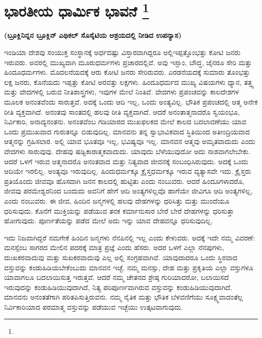 
\chapter[ಭಾರತೀಯ ಧಾರ್ಮಿಕ ಭಾವನೆ ]{ಭಾರತೀಯ ಧಾರ್ಮಿಕ ಭಾವನೆ \protect\footnote{}}

\centerline{\textbf{(ಬ್ರೂಕ್ಲಿನಿನ್ನನ ಬ್ರೂಕ್ಲಿನ್​ ಎಥಿಕಲ್​ ಸೊಸೈಟಿಯ ಆಶ್ರಯದಲ್ಲಿ ನೀಡಿದ ಉಪನ್ಯಾಸ)}}

ಇಂಡಿಯಾ ದೇಶವು ಸಂಯುಕ್ತ ಸಂಸ್ಥಾನಕ್ಕೆ ಅರ್ಧದಷ್ಟು ವಿಸ್ತಾರವಾಗಿದ್ದರೂ ಅಲ್ಲಿ\break ಇಪ್ಪತ್ತೊಂಭತ್ತು ಕೋಟಿ ಜನರು ಇರುವರು. ಅವರಲ್ಲಿ ಮುಖ್ಯವಾಗಿ ಮೂರು\break ಧರ್ಮಗಳು ಪ್ರಚಾರದಲ್ಲಿವೆ. ಅವು ಇಸ್ಲಾಂ, ಬೌದ್ಧ, ಜೈನರೂ ಸೇರಿ ಮತ್ತು ಹಿಂದೂಧರ್ಮಗಳು. ಮೊದಲನೆಯದಕ್ಕೆ ಆರು ಕೋಟಿ ಜನರು ಸೇರಿರುವರು. ಎರಡನೆಯದಕ್ಕೆ ಸುಮಾರು ತೊಂಭತ್ತು ಲಕ್ಷ ಜನರು, ಕೊನೆಯದು ಇಪ್ಪತ್ತು ಕೋಟಿ ಅರವತ್ತು ಲಕ್ಷಗಳು. ಹಿಂದೂಧರ್ಮದ ಮುಖ್ಯ ವಿಷಯಗಳು ಧ್ಯಾನ, ತತ್ತ್ವ ಮತ್ತು ವೇದಗಳಲ್ಲಿ ಬರುವ ನೀತಿಶಾಸ್ತ್ರಗಳು, ಇವುಗಳ ಮೇಲೆ ನಿಂತಿವೆ. ವೇದಗಳು ಪ್ರಪಂಚವನ್ನು ಕಾಲದೇಶಗಳ ಮೂಲಕ ಅನಂತವೆಂದು ಸಾರುತ್ತವೆ. ಅದಕ್ಕೆ ಒಂದು ಆದಿ ಇಲ್ಲ, ಒಂದು ಅಂತ್ಯವಿಲ್ಲ. ಭೌತಿಕ ಪ್ರಪಂಚದಲ್ಲಿ ಆತ್ಮ ಅನೇಕ ರೀತಿ ವ್ಯಕ್ತವಾಗಿದೆ. ಅನಂತವು ಸಾಂತದಲ್ಲಿ ಹಲವು ರೀತಿ ವ್ಯಕ್ತವಾಗಿದೆ. ಆದರೆ ಅನಂತಾತ್ಮನಾದರೊ ಸ್ವಯಂಭೂ, ನಿರ್ವಿಕಾರಿ, ಅನಾದ್ಯನಂತನು. ಅನಂತವೆಂಬ ಗಡಿಯಾರದ ಮುಖಫಲಕದ ಮೇಲೆ ಕಾಲದ ಬದಲಾವಣೆಯು ಯಾವ ಒಂದು ಪ್ರಮುಖವಾದ ಗುರುತನ್ನೂ ಬಿಡುವುದಿಲ್ಲ. ಮಾನವನು ತನ್ನ ಸ್ವಾಭಾವಿಕವಾದ ಸ್ಥಿತಿಯಿಂದ ಅತೀಂದ್ರಿಯವಾದ ಆತ್ಮನನ್ನು ಗ್ರಹಿಸಲಾರ. ಅಲ್ಲಿ ಯಾವ ಭೂತವೂ ಇಲ್ಲ, ಭವಿಷ್ಯವೂ ಇಲ್ಲ. ಮಾನವನ ಆತ್ಮವು ಅಮೃತವಾದುದು ಎಂದು ವೇದಗಳು ಸಾರುವುವು. ದೇಹವು ಷಡ್ವಿಕಾರಾತ್ಮಕವಾದುದು. ಯಾವುದು ಬೆಳೆಯುವುದೋ ಅದು ನಾಶವಾಗಲೇಬೇಕು. ಆದರೆ ಒಳಗೆ ಇರುವ ಆತ್ಮನಾದರೊ ಅನಂತವಾದ ಮತ್ತು ನಿತ್ಯವಾದ ಜೀವನಕ್ಕೆ ಸಂಬಂಧಿಸಿರುವುದು. ಅದಕ್ಕೆ ಒಂದು ಆದಿಯೇ ಇರಲಿಲ್ಲ. ಅಂತ್ಯವೂ ಇರುವುದಿಲ್ಲ. ಹಿಂದುಧರ್ಮಕ್ಕೂ ಕ್ರೈಸ್ತಧರ್ಮಕ್ಕೂ ಇರುವ ವ್ಯತ್ಯಾಸವೇ ಇದು. ಕ್ರೈಸ್ತರು ಪ್ರತಿಯೊಂದು ಜೀವವೂ ಹೊಸದಾಗಿ ಜನನ ಕಾಲದಲ್ಲಿ ಹುಟ್ಟಿತು ಎಂದು ನಂಬುವರು. ಆದರೆ ಹಿಂದೂಗಳಾದರೊ, ಜೀವವು ಪರಮೇಶ್ವರನಿಂದ ಬಂದುದು ಅವನಿಗೆ ಹೇಗೆ ಆದಿ ಅಂತ್ಯಗಳಿಲ್ಲವೊ ಹಾಗೆಯೇ ಜೀವಿಗೂ ಆದಿ ಅಂತ್ಯಗಳಿಲ್ಲ, ಎಂದು ನಂಬುವರು. ಈ ಜೀವ, ಹಿಂದಿನ ಜನ್ಮಗಳಲ್ಲಿ ಹಲವು ದೇಹಗಳನ್ನು ಧರಿಸಿತ್ತು ಮತ್ತು ಮುಂದೆಯೂ ಧರಿಸುವುದು. ಕೊನೆಗೆ ಮುಕ್ತಿಯನ್ನು ಪಡೆಯುವ ತನಕ ಕರ್ಮಾನುಸಾರ ಬೇರೆ ಬೇರೆ ದೇಹಗಳನ್ನು ಧರಿಸುತ್ತಾ ಹೋಗುವುದು. ಪೂರ್ಣತೆಯನ್ನು ಪಡೆದ ಮೇಲೆ ಅದು ಇನ್ನು ಯಾವ ದೇಹವನ್ನೂ ಧರಿಸುವುದಿಲ್ಲ.

ಇದು ನಿಜವಾಗಿದ್ದರೆ ನಮಗೇಕೆ ಹಿಂದಿನ ಜನ್ಮಗಳು ನೆನಪಿನಲ್ಲಿ ಇಲ್ಲ ಎಂದು ಕೇಳುವರು. ಅದಕ್ಕೆ ಇದೇ ನಮ್ಮ ವಿವರಣೆ: ಮನಸ್ಸೆಂಬ ಸಾಗರದ ಮೇಲಿನ ಪದರಕ್ಕೆ ಮಾತ್ರ ಪ್ರಜ್ಞೆ ಎಂದು ಹೆಸರು. ಅದರ ಒಳಗೆ ಎಲ್ಲಾ ನೆನಪುಗಳು, ದುಃಖಕರವಾದುವು ಮತ್ತು ಸುಖಕರವಾದುವು ಎಲ್ಲ ಅಲ್ಲಿ ಸಂಗ್ರಹವಾಗಿವೆ. ಯಾವುದಾದರೂ ಒಂದು ಸ್ಥಿರವಾದ ವಸ್ತುವನ್ನು ಕಂಡುಹಿಡಿಯಬೇಕೆಂಬುದು ಮಾನವನ ಇಚ್ಛೆ. ನಮ್ಮ ಮನಸ್ಸು, ದೇಹ ಮತ್ತು ಪ್ರಕೃತಿಯ ಎಲ್ಲಾ ವಸ್ತುಗಳೂ ಯಾವಾಗಲೂ ಬದಲಾಯಿಸುತ್ತ ಇರುತ್ತವೆ. ಆದರೆ ನಮ್ಮ ಚೇತನದ ಶ್ರೇಷ್ಠ ಗುರಿಯಾದರೋ, ಬಲಾಯಿಸದೆ ಇರುವುದನ್ನು ಕಂಡುಹಿಡಿಯುವುದಾಗಿದೆ, ನಿತ್ಯ ಪರಿಪೂರ್ಣವಾಗಿರುವ ವಸ್ತುವನ್ನು ಕಂಡುಹಿಡಿಯುವುದಾಗಿದೆ. ಮಾನವನು ಅನಂತತೆಗಾಗಿ ಪರಿತಪಿಸುತ್ತಿರುವನು. ನಮ್ಮ ನೈತಿಕ ಮತ್ತು ಭೌತಿಕ ಬೆಳವಣಿಗೆಯು ಸೂಕ್ಷ್ಮವಾದಂತೆಲ್ಲ ನಿರ್ವಿಕಾರಿಯಾದ ಪರಮಾತ್ಮ ವಸ್ತುವನ್ನು ಪಡೆಯುವ ಇಚ್ಛೆಯು ಉತ್ಕಟವಾಗುವುದು.

